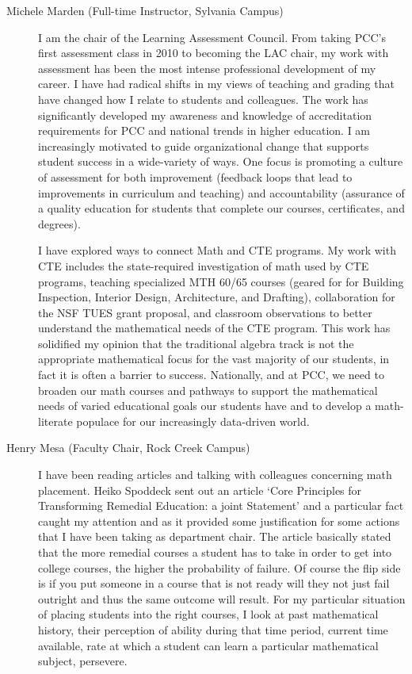 \begin{description}
	\item[Michele Marden (Full-time Instructor, Sylvania Campus)]
	I am the chair of the Learning Assessment Council.  From taking PCC's first
	assessment class in 2010 to becoming the LAC chair, my work with assessment has
	been the most intense professional development of my career. I have had radical
	shifts in my views of teaching and grading that have changed how I relate to
	students and colleagues. The work has significantly developed my awareness and
	knowledge of accreditation requirements for PCC and national trends in higher
	education. I am increasingly motivated to guide organizational change that
	supports student success in a wide-variety of ways. One focus is promoting a
	culture of assessment for both improvement (feedback loops that lead to
	improvements in curriculum and teaching) and accountability (assurance of a
	quality education for students that complete our courses, certificates, and
	degrees).

	I have explored ways to connect Math and CTE programs.  My work with CTE
	includes the state-required investigation of math used by CTE programs,
	teaching specialized MTH 60/65 courses (geared for for Building Inspection,
	Interior Design, Architecture, and Drafting), collaboration for the NSF TUES
	grant proposal, and classroom observations to better understand the
	mathematical needs of the CTE program. This work has solidified my opinion that
	the traditional algebra track is not the appropriate mathematical focus for the
	vast majority of our students, in fact it is often a barrier to success.
	Nationally, and at PCC, we need to broaden our math courses and pathways to
	support the mathematical needs of varied educational goals our students have
	and to develop a math-literate populace for our increasingly data-driven world.

	\item[Henry Mesa (Faculty Chair, Rock Creek Campus)]
	I have been reading articles and talking with colleagues concerning math
	placement.  Heiko Spoddeck sent out an article `Core Principles for
	Transforming Remedial Education: a joint Statement'  and a particular fact
	caught my attention and as it provided some justification for some actions that
	I have been taking as department chair.  The article basically stated that the
	more remedial courses a student has to take in order to get into college
	courses, the higher the probability of failure.  Of course the flip side is if
	you put someone in a course that is not ready will they not just fail outright
	and thus the same outcome will result.   For my particular situation of placing
	students into the right courses, I look at past mathematical history, their
	perception of ability during that time period, current time available, rate at
	which a student can learn a particular mathematical subject, persevere.


\end{description}
